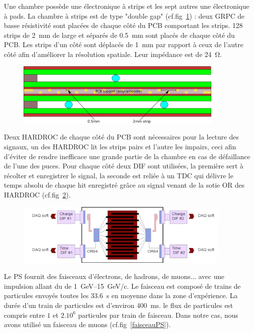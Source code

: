 Une chambre possède une électronique à strips et les sept autres une électronique à pads. La chambre à strips est de type "double gap" (cf.fig~\ref{DoubleGap}) : deux GRPC de basse résistivité sont placées de chaque côté du PCB comportant les strips. \num{128} strips de \SI{2}{\milli\meter} de large et séparés de \SI{0.5}{\milli\meter} sont placés de chaque côté du PCB. Les strips d'un côté sont déplacés de \SI{1}{\milli\meter} par rapport à ceux de l'autre côté afin d'améliorer la résolution spatiale. Leur impédance est de \SI{24}{\ohm}. 

\begin{figure}[ht!]
	\centering
	\includegraphics[width=0.9\textwidth]{GLA/DoubleGap.png}
	\label{DoubleGap}
\end{figure}

Deux HARDROC de chaque côté du PCB sont nécessaires pour la lecture des signaux, un des HARDROC lit les strips pairs et l'autre les impairs, ceci afin d'éviter de rendre inefficace une grande partie de la chambre en cas de défaillance de l'une des puces. Pour chaque côté deux DIF sont utilisées, la première sert à récolter et enregistrer le signal, la seconde est reliée à un TDC qui délivre le temps absolu de chaque hit enregistré grâce au signal venant de la sotie OR des HARDROC (cf.fig~\ref{SchemePS}).

\begin{figure}[ht!]
	\centering
	\includegraphics[width=0.93\textwidth]{GLA/SchemePS.png}
	\label{SchemePS}
\end{figure}

Le PS fournit des faisceaux d'électrons, de hadrons, de muons... avec une impulsion allant du de \SIrange{1}{15}{\giga\eV}/c. Le faisceau est composé de trains de particules envoyés toutes les \SI{33.6}{\second} en moyenne dans la zone d'expérience. La durée d'un train de particules est d'environ \SI{400}{\milli\second}. le flux de particules est compris entre $1$ et $2.10^{6}$ particules par train de faisceau. Dans notre cas, nous avons utilisé un faisceau de muons (cf.fig~\ref{faisceauPS}).
 
